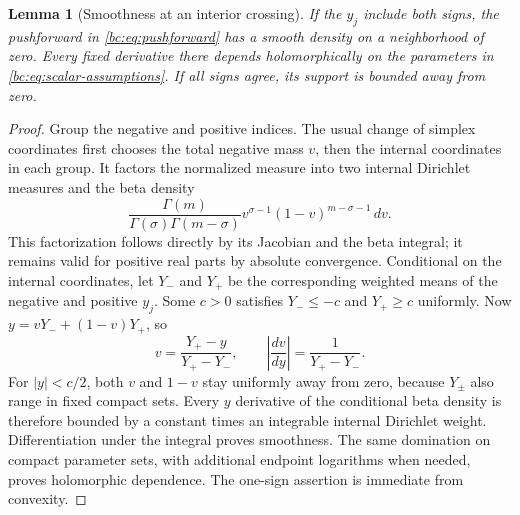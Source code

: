 \documentclass[11pt,letterpaper]{article}
\numberwithin{equation}{section}
\newtheorem{lemma}[theorem]{Lemma}
\theoremstyle{definition}
\theoremstyle{remark}
\begin{document}
\begin{lemma}[Smoothness at an interior crossing]\label{bc:lem:smooth}
If the $y_j$ include both signs, the pushforward in
\eqref{bc:eq:pushforward} has a smooth density on a neighborhood of zero.
Every fixed derivative there depends holomorphically on the parameters
in \eqref{bc:eq:scalar-assumptions}. If all signs agree, its support is
bounded away from zero.
\end{lemma}
\begin{proof}
Group the negative and positive indices. The usual change of simplex
coordinates first chooses the total negative mass $v$, then the internal
coordinates in each group. It factors the normalized measure into two
internal Dirichlet measures and the beta density
\[
 \frac{\Gamma(m)}{\Gamma(\sigma)\Gamma(m-\sigma)}
               v^{\sigma-1}(1-v)^{m-\sigma-1}\,dv.
\]
This factorization follows directly by its Jacobian and the beta
integral; it remains valid for positive real parts by absolute
convergence. Conditional on the internal coordinates, let $Y_-$ and
$Y_+$ be the corresponding weighted means of the negative and positive
$y_j$. Some $c>0$ satisfies $Y_-\le-c$ and $Y_+\ge c$ uniformly.
Now $y=vY_-+(1-v)Y_+$, so
\[
 v=\frac{Y_+-y}{Y_+-Y_-},\qquad
 \left|\frac{dv}{dy}\right|=\frac1{Y_+-Y_-}.
\]
For $|y|<c/2$, both $v$ and $1-v$ stay uniformly away from zero, because
$Y_\pm$ also range in fixed compact sets. Every $y$ derivative of the
conditional beta density is therefore bounded by a constant times an
integrable internal Dirichlet weight. Differentiation under the integral
proves smoothness. The same domination on compact parameter sets, with
additional endpoint logarithms when needed, proves holomorphic
dependence. The one-sign assertion is immediate from convexity.
\end{proof}
\end{document}
